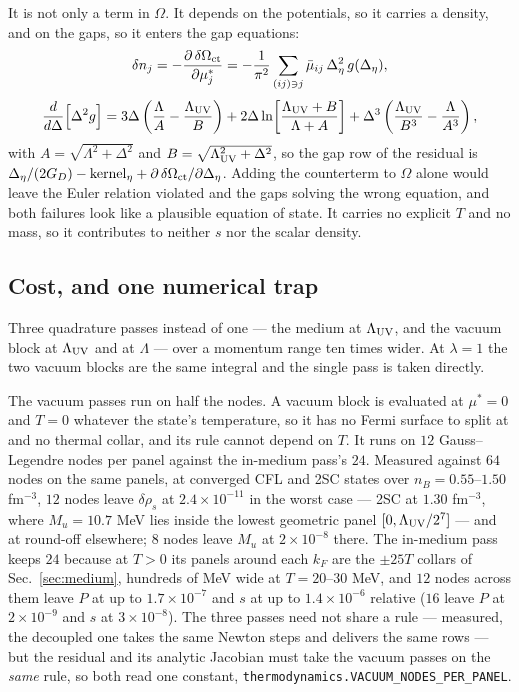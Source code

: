 \documentclass[aps,prc,onecolumn,superscriptaddress,nofootinbib,10pt]{revtex4-2}
\newcommand{\Lam}{\Lambda}
\newcommand{\GD}{G_D}
\begin{document}
It is not only a term in $\Omega$. It depends on the potentials, so it carries
a density, and on the gaps, so it enters the gap equations:
%
\begin{equation}
  \delta n_j = -\frac{\partial\, \delta\Omega_{\rm ct}}{\partial \mu^{*}_j}
             = -\frac{1}{\pi^2} \sum_{(ij) \ni j}
                \bar\mu_{ij}\,\Delta_\eta^2\, g(\Delta_\eta) ,
  \label{eq:countertermdensity}
\end{equation}
\begin{equation}
  \frac{d}{d\Delta}\Big[\Delta^2 g\Big]
  = 3\Delta\left(\frac{\Lam}{A} - \frac{\Lam_{\rm UV}}{B}\right)
  + 2\Delta \ln\!\left[\frac{\Lam_{\rm UV} + B}{\Lam + A}\right]
  + \Delta^3\left(\frac{\Lam_{\rm UV}}{B^3} - \frac{\Lam}{A^3}\right) ,
  \label{eq:countertermgap}
\end{equation}
%
with $A = \sqrt{\Lam^2 + \Delta^2}$ and $B = \sqrt{\Lam_{\rm UV}^2 + \Delta^2}$,
so the gap row of the residual is
$\Delta_\eta/(2\GD) - \mathrm{kernel}_\eta + \partial\,\delta\Omega_{\rm ct}/
\partial\Delta_\eta$. Adding the counterterm to $\Omega$ alone would leave the
Euler relation violated and the gaps solving the wrong equation, and both
failures look like a plausible equation of state. It carries no explicit $T$
and no mass, so it contributes to neither $s$ nor the scalar density.

\subsection{Cost, and one numerical trap}
\label{sec:rgcost}

Three quadrature passes instead of one --- the medium at $\Lam_{\rm UV}$, and
the vacuum block at $\Lam_{\rm UV}$ and at $\Lam$ --- over a momentum range ten
times wider. At $\lambda = 1$ the two vacuum blocks are the same integral and
the single pass is taken directly.

The vacuum passes run on half the nodes. A vacuum block is evaluated at
$\mu^* = 0$ and $T = 0$ whatever the state's temperature, so it has no Fermi
surface to split at and no thermal collar, and its rule cannot depend on $T$.
It runs on $12$ Gauss--Legendre nodes per panel against the in-medium pass's
$24$. Measured against $64$ nodes on the same panels, at converged CFL and 2SC
states over $n_B = 0.55$--$1.50$ fm$^{-3}$, $12$ nodes leave $\delta\rho_s$ at
$2.4\times10^{-11}$ in the worst case --- 2SC at $1.30$ fm$^{-3}$, where
$M_u = 10.7$ MeV lies inside the lowest geometric panel
$[0, \Lam_{\rm UV}/2^7]$ --- and at round-off elsewhere; $8$ nodes leave $M_u$ at
$2\times10^{-8}$ there. The in-medium pass keeps $24$ because at $T > 0$ its
panels around each $k_F$ are the $\pm 25T$ collars of Sec.~\ref{sec:medium},
hundreds of MeV wide at $T = 20$--$30$ MeV, and $12$ nodes across them leave
$P$ at up to $1.7\times10^{-7}$ and $s$ at up to $1.4\times10^{-6}$ relative ($16$ leave $P$ at
$2\times10^{-9}$ and $s$ at $3\times10^{-8}$). The three passes need not share
a rule --- measured, the decoupled one takes the same Newton steps and delivers
the same rows --- but the residual and its analytic Jacobian must take the
vacuum passes on the \emph{same} rule, so both read one constant,
\texttt{thermodynamics.VACUUM\_NODES\_PER\_PANEL}.
\end{document}
